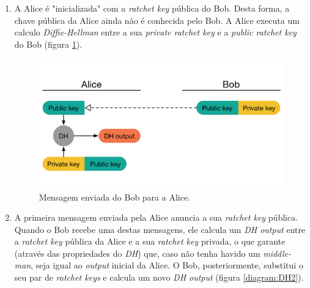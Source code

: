 \begin{enumerate}
    \item A Alice é "inicializada" com a \textit{ratchet key} pública do Bob. Desta forma, a chave pública da Alice ainda não é conhecida pelo Bob. A Alice executa um calculo \textit{Diffie-Hellman} entre a sua \textit{private ratchet key} e a \textit{public ratchet key} do Bob (figura \ref{diagram:DH1}).

    \begin{figure}[H]
        \begin{center}
            \includegraphics[width=12cm]{img/DH1.png}
            \caption{Mensagem enviada do Bob para a Alice.}
            \label{diagram:DH1}
        \end{center}
    \end{figure}

    \item A primeira mensagem enviada pela Alice anuncia a sua \textit{ratchet key} pública. Quando o Bob recebe uma destas mensagens, ele calcula um \textit{DH output} entre a \textit{ratchet key} pública da Alice e a sua \textit{ratchet key} privada, o que garante (através das propriedades do \textit{DH}) que, caso não tenha havido um \textit{middle-man}, seja igual ao \textit{output} inicial da Alice. O Bob, posteriormente, substitui o seu par de \textit{ratchet keys} e calcula um novo \textit{DH output} (figura \ref{diagram:DH2}).


\end{enumerate}
